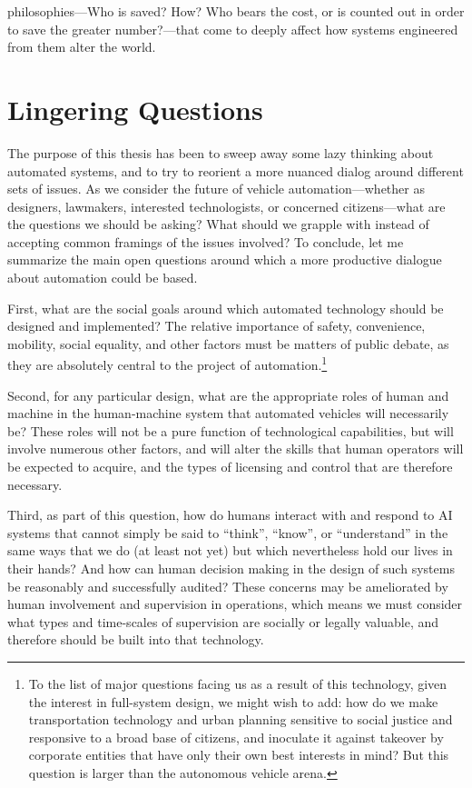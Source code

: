 philosophies---Who is saved? How? Who bears the cost, or is
counted out in order to save the greater number?---that come to deeply
affect how systems engineered from them alter the world.

\section{Lingering Questions}

The purpose of this thesis has been to sweep away some lazy thinking
about automated systems, and to try to reorient a more nuanced dialog
around different sets of issues. As we consider the future of
vehicle automation---whether as
designers, lawmakers, interested technologists, or concerned
citizens---what are the questions we should be asking? What should we
grapple with instead of accepting common framings of the issues
involved? To conclude, let me summarize the main open questions around
which a more productive dialogue about automation could be based.

First, what are the social goals around which automated technology
should be designed and implemented? The relative importance of safety,
convenience, mobility, social equality, and other factors must be
matters of public debate, as they are absolutely central to the
project of automation.\footnote{To the list
of major questions facing us as a result of this technology, given the
interest in full-system design, we might
wish to
add: how do we make transportation technology and urban planning sensitive to social
justice and responsive to a broad base of citizens, and inoculate it
against takeover by corporate entities that have only their own best interests
in mind? But this question is larger than the autonomous vehicle arena.}

Second, for any particular design, what are the appropriate roles of
human and machine in the human-machine system that automated vehicles
will necessarily be? These roles will not be a pure function of
technological capabilities, but will involve numerous other factors,
and will alter the skills that human operators will be expected to
acquire, and the types of licensing and control that are therefore
necessary. 

Third, as part of this question, how do humans interact with and
respond to AI systems that cannot simply be said to
``think'', ``know'', or ``understand'' in the same ways that we do (at
least not yet) but which nevertheless hold our lives in their hands?
And how can human decision making in the design of such systems be
reasonably and successfully audited?
These concerns may be ameliorated by human involvement and
supervision in operations, which means we must consider what types and
time-scales of supervision are socially or legally valuable, and
therefore should be built into that technology. 

